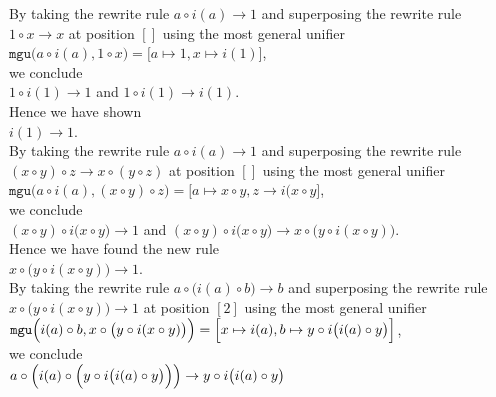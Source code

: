 By taking the rewrite rule $a \circ i(a) \rightarrow 1$ and superposing the rewrite rule $1 \circ x \rightarrow x$ at position $[]$ using
the most general unifier
\\[0.2cm]
\hspace*{1.3cm}
$\mathtt{mgu}\bigl(a \circ i(a), 1 \circ x\bigr) = \bigl[a \mapsto 1, x \mapsto i(1)\bigr]$,
\\[0.2cm]
we conclude
\\[0.2cm]
\hspace*{1.3cm}
$1 \circ i(1) \rightarrow 1$ \quad and \quad $1 \circ i(1) \rightarrow i(1)$.
\\[0.2cm]
Hence we have shown
\\[0.2cm]
\hspace*{1.3cm}
$i(1) \rightarrow 1$.
\\[0.2cm]
By taking the rewrite rule $a \circ i(a) \rightarrow 1$ and superposing the rewrite rule
$(x \circ y) \circ z \rightarrow x \circ (y \circ z)$
at position $[]$ using the most general unifier
\\[0.2cm]
\hspace*{1.3cm}
$\mathtt{mgu}\bigl(a \circ i(a), (x \circ y) \circ z\bigr) = \bigl[a \mapsto x \circ y, z \rightarrow i(x \circ
y\bigr]$,
\\[0.2cm]
we conclude
\\[0.2cm]
\hspace*{1.3cm}
$(x \circ y) \circ i\bigl(x \circ y) \rightarrow 1$ \quad and \quad
$(x \circ y) \circ i\bigl(x \circ y) \rightarrow x \circ \bigl(y \circ i(x \circ y)\bigr)$.
\\[0.2cm]
Hence we have found the new rule
\\[0.2cm]
\hspace*{1.3cm}
$x \circ \bigl(y \circ i(x \circ y)\bigr) \rightarrow 1$.
\\[0.2cm]
By taking the rewrite rule $a \circ \bigl(i(a) \circ b\bigr) \rightarrow b$ and superposing the rewrite rule 
$x \circ \bigl(y \circ i(x \circ y)\bigr) \rightarrow 1$ at position $[2]$ using the most general unifier
\\[0.2cm]
\hspace*{1.3cm}
$\mathtt{mgu}\Bigl(i(a) \circ b, x \circ \bigl(y \circ i(x \circ y)\bigr)\Bigr) =
\Bigl[x \mapsto i(a), b \mapsto y \circ i\bigl(i(a) \circ y\bigr)\Bigr]$, 
\\[0.2cm]
we conclude
\\[0.2cm]
\hspace*{1.3cm}
$a \circ \Bigl(i(a) \circ \Bigl(y \circ i\bigl(i(a)\circ y\bigr)\Bigr)\Bigr) \rightarrow y \circ i\bigl(i(a)\circ y\bigr)$
